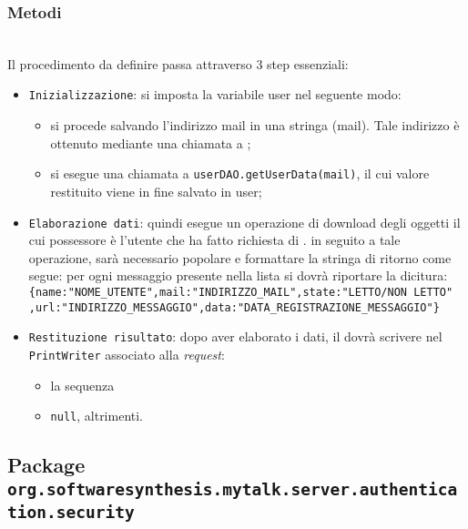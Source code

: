 \subsubsection*{Metodi}
\begin{description}
	\item{}\\
	Il procedimento da definire passa attraverso 3 step essenziali:
	\begin{itemize}
		\item \texttt{Inizializzazione}: si imposta la variabile user nel seguente modo:
			\begin{itemize}
				\item si procede salvando l'indirizzo mail in una stringa (mail). Tale indirizzo è ottenuto mediante una chiamata a ;
				\item si esegue una chiamata a \texttt{userDAO.getUserData(mail)}, il cui valore restituito viene in fine salvato in user;
			\end{itemize}
		\item \texttt{Elaborazione dati}: quindi esegue un operazione di download degli oggetti  il cui possessore è l'utente che ha fatto richiesta di . in seguito a tale operazione, sarà necessario popolare e formattare la stringa di ritorno come segue: per ogni messaggio presente nella lista si dovrà riportare la dicitura:\\
		
		\verb|{name:"NOME_UTENTE",mail:"INDIRIZZO_MAIL",state:"LETTO/NON LETTO"|\\
		\verb|,url:"INDIRIZZO_MESSAGGIO",data:"DATA_REGISTRAZIONE_MESSAGGIO"}|\\
	
		\item \texttt{Restituzione risultato}: dopo aver elaborato i dati, il  dovrà scrivere nel \texttt{PrintWriter} associato alla \textit{request}:
			\begin{itemize}
				\item la sequenza
				\item \texttt{null}, altrimenti.
			\end{itemize}
	\end{itemize}

\end{description}

\subsection{Package \texttt{org.softwaresynthesis.mytalk.server.authentication.security}}\label{sec:authentication}

